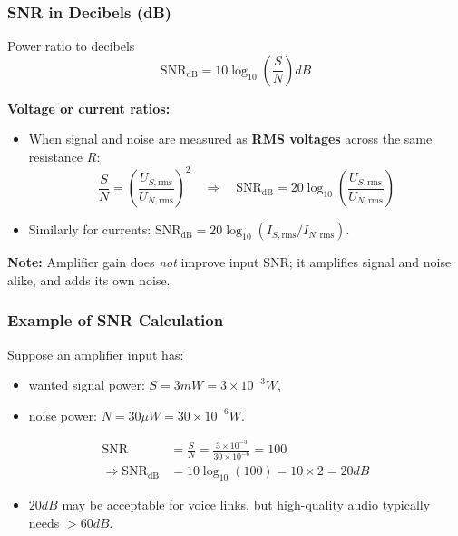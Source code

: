 \begin{frame}
	\frametitle{SNR in Decibels (dB)}
	\begin{block}{Power ratio to decibels}
		\begin{equation}
			\boxed{\mathrm{SNR}_{\mathrm{dB}} = 10\log_{10}\!\left(\frac{S}{N}\right) \unit{dB}}
		\end{equation}
	\end{block}
	\textbf{Voltage or current ratios:}
	\begin{itemize}
		\item When signal and noise are measured as \textbf{RMS voltages} across the same resistance $R$:
		\begin{equation}
			\frac{S}{N} = \left(\frac{U_{S,\mathrm{rms}}}{U_{N,\mathrm{rms}}}\right)^2
			\quad \Rightarrow \quad
			\mathrm{SNR}_{\mathrm{dB}} = 20\log_{10}\!\left(\frac{U_{S,\mathrm{rms}}}{U_{N,\mathrm{rms}}}\right)
		\end{equation}
		\item Similarly for currents: \;$\mathrm{SNR}_{\mathrm{dB}} = 20\log_{10}(I_{S,\mathrm{rms}}/I_{N,\mathrm{rms}})$.
	\end{itemize}
	\textbf{Note:} Amplifier gain does \emph{not} improve input SNR; it amplifies signal and noise alike, and adds its own noise.
\end{frame}

\begin{frame}
	\frametitle{Example of SNR Calculation}
	Suppose an amplifier input has:
	\begin{itemize}
		\item wanted signal power: $S = 3\unit{mW}=3\times10^{-3}\unit{W}$,
		\item noise power: $N = 30\unit{\mu W}=30\times10^{-6}\unit{W}$.
	\end{itemize}
	\begin{align*}
		\mathrm{SNR} &= \frac{S}{N} = \frac{3\times10^{-3}}{30\times10^{-6}} = 100 \\
		\Rightarrow \mathrm{SNR}_{\mathrm{dB}} &= 10\log_{10}(100)=10\times 2 = 20\unit{dB}
	\end{align*}
	\begin{itemize}
		\item $20\unit{dB}$ may be acceptable for voice links, but high-quality audio typically needs $>60\unit{dB}$.
	\end{itemize}
\end{frame}

